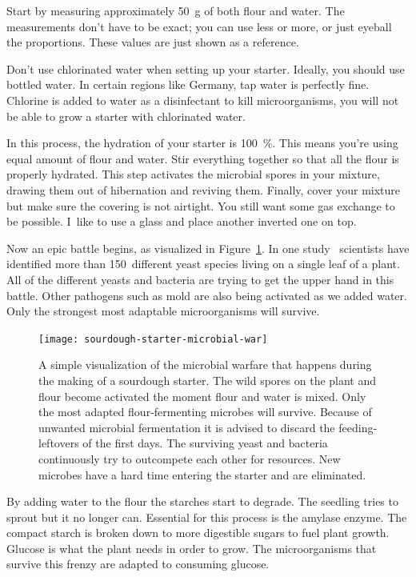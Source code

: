 Start by measuring approximately \qty{50}{\gram} of both flour and
water. The measurements don't have to be exact; you can use
less or more, or just eyeball the proportions. These
values are just shown as a reference.

Don't use chlorinated water when setting up your starter.
Ideally, you should use bottled water. In certain regions
like Germany, tap water is perfectly fine. Chlorine is added
to water as a disinfectant to kill microorganisms, you will
not be able to grow a starter with chlorinated water.

In this process, the hydration of your starter is \qty{100}{\percent}.
This means you're using equal amount of flour and
water. Stir everything together so that all the flour is
properly hydrated. This step activates the microbial spores
in your mixture, drawing them out of hibernation and
reviving them.
Finally, cover your mixture but make sure the covering is
not airtight. You still want some gas exchange to be possible.
I~like to use a glass and place another
inverted one on top.

Now an epic battle begins, as visualized in 
Figure~\ref{fig:sourdough-starter-microbial-war}. In one 
study~\cite{yeasts+biocontrol+agent} scientists have identified
more than \num{150}~different yeast species living
on a single leaf of a plant.
All of the different yeasts and bacteria are trying to get
the upper hand in this battle. Other pathogens such as mold
are also being activated as we added water. Only the strongest
most adaptable microorganisms will survive.

\begin{figure}[!htb]
  \texttt{[image: sourdough-starter-microbial-war]}
  \caption[Microbial warfare during sourdough early days]{A simple
      visualization of the microbial warfare that happens during the making of
      a sourdough starter. The wild spores on the plant and flour become
      activated the moment flour and water is mixed.  Only the most adapted
      flour-fermenting microbes will survive. Because of unwanted microbial
      fermentation it is advised to discard the feeding-leftovers of the first
      days. The surviving yeast and bacteria continuously try to outcompete
      each other for resources. New microbes have a hard time entering the
      starter and are eliminated.}%
  \label{fig:sourdough-starter-microbial-war}
\end{figure}

By adding water to the
flour the starches start to degrade. The seedling tries to
sprout but it no longer can. Essential for this process is the
amylase enzyme. The compact starch is broken down to more
digestible sugars to fuel plant growth. Glucose is what the
plant needs in order to grow. The microorganisms that survive
this frenzy are adapted to consuming glucose. 

